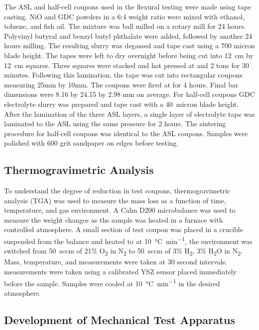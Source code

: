 The ASL and half-cell coupons used in the flexural testing were made using tape casting.
NiO and GDC powders in a 6:4 weight ratio were mixed with ethanol, toluene, and fish oil.
The mixture was ball milled on a rotary mill for 24 hours.
Polyvinyl butyral and benzyl butyl phthalate were added, followed by another 24 hours milling.
The resulting slurry was degassed and tape cast using a 700 micron blade height.
The tapes were left to dry overnight before being cut into \SI{12}{\centi\meter} by \SI{12}{\centi\meter} squares.
Three squares were stacked and hot pressed at  and 2 tons for 30 minutes.
Following this lamination, the tape was cut into rectangular coupons measuring 25mm by 10mm.
The coupons were fired at  for 4 hours.
Final bar dimensions were 8.16 by 24.15 by 2.98 mm on average.
For half-cell coupons GDC electrolyte slurry was prepared and tape cast with a \SI{40}{micron} blade height.
After the lamination of the three ASL layers, a single layer of electrolyte tape was laminated to the ASL using the same pressure for 2 hours.
The sintering procedure for half-cell coupons was identical to the ASL coupons.
Samples were polished with 600 grit sandpaper on edges before testing.

\subsection{Thermogravimetric Analysis}

To understand the degree of reduction in test coupons, thermogravimetric analysis (TGA) was used to measure the mass loss as a function of time,
temperature, and gas environment.
A Cahn D200 microbalance was used to measure the weight changes as the sample was heated in a furnace with controlled atmosphere.
A small section of test coupon was placed in a crucible suspended from the balance and heated to  at \SI{10}{\celsius\per\minute}, the environment was switched from \SI{50}{sccm} of 21\% O\textsubscript{2} in
N\textsubscript{2} to \SI{50}{sccm} of 3\% H\textsubscript{2}, 3\%
H\textsubscript{2}O in N\textsubscript{2}.
Mass, temperature, and
 measurements were taken at 30 second intervals.
 measurements were taken using a calibrated YSZ sensor placed immediately before the sample.
Samples were cooled at \SI{10}{\celsius\per\minute} in the desired atmosphere.

\subsection{Development of Mechanical Test Apparatus}

